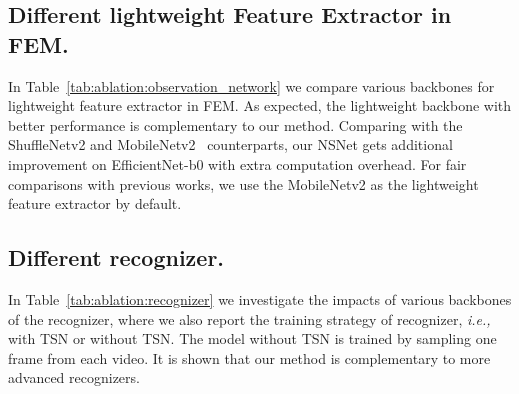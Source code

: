 \documentclass[runningheads]{llncs}
\newcommand{\tabref}[1]{Table~\ref{#1}}
\begin{document}
\subsection{Different lightweight Feature Extractor in FEM.}
In \tabref{tab:ablation:observation_network} we compare various backbones for lightweight feature extractor in FEM. 
As expected, the lightweight backbone with better performance is complementary to our method.
Comparing with the ShuffleNetv2 \cite{shufflenetv2} and MobileNetv2~\cite{mobilenetv2} counterparts, our NSNet gets additional improvement on EfficientNet-b0 \cite{efficientnet} with extra computation overhead.
For fair comparisons with previous works, we use the MobileNetv2 as the lightweight feature extractor by default.
\begin{table}[h]
\centering
{}
\caption{Study on different backbones for lightweight extractor in FEM. FLOPs/f means FLOPs for each frame processed by the backbone.}
\label{tab:ablation:observation_network}
\end{table}
\subsection{Different recognizer.}
In \tabref{tab:ablation:recognizer} we investigate the impacts of various backbones of the recognizer, where we also report the training strategy of recognizer, \emph{i.e.,} with TSN or without TSN. The model without TSN is trained by sampling one frame from each video. 
It is shown that our method is complementary to more advanced recognizers.
\begin{table}[h]
\centering
{}
\caption{Study on different backbones for the recognizer. ``Train'' refers to training strategy, \emph{viz.,} with TSN style training or without TSN style Training.}
\label{tab:ablation:recognizer}
\end{table}
\end{document}

